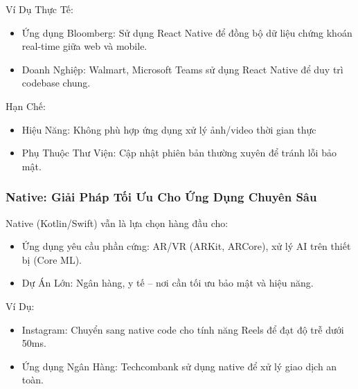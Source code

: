     
      \hspace*{0.8cm}Ví Dụ Thực Tế:
      \setlength{\leftmargini}{1.5cm}
      \begin{itemize}
          \item Ứng dụng Bloomberg: Sử dụng React Native để đồng bộ dữ liệu chứng khoán real-time giữa web và mobile.
          \item Doanh Nghiệp: Walmart, Microsoft Teams sử dụng React Native để duy trì codebase chung.
      \end{itemize}
    \vspace{0.5em}

    
      \hspace*{0.8cm}Hạn Chế:
      \setlength{\leftmargini}{1.5cm}
      \begin{itemize}
          \item Hiệu Năng: Không phù hợp ứng dụng xử lý ảnh/video thời gian thực
          \item Phụ Thuộc Thư Viện: Cập nhật phiên bản thường xuyên để tránh lỗi bảo mật.
      \end{itemize}
    \vspace{0.5em}

    \subsubsection{Native: Giải Pháp Tối Ưu Cho Ứng Dụng Chuyên Sâu}
    
      \hspace*{0.8cm}Native (Kotlin/Swift) vẫn là lựa chọn hàng đầu cho:
      \setlength{\leftmargini}{1.5cm}
      \begin{itemize}
        \item Ứng dụng yêu cầu phần cứng: AR/VR (ARKit, ARCore), xử lý AI trên thiết bị (Core ML).
        \item Dự Án Lớn: Ngân hàng, y tế – nơi cần tối ưu bảo mật và hiệu năng.
      \end{itemize}
    \vspace{0.5em}

    
      \hspace*{0.8cm}Ví Dụ:
      \setlength{\leftmargini}{1.5cm}
      \begin{itemize}
          \item Instagram: Chuyển sang native code cho tính năng Reels để đạt độ trễ dưới 50ms.
          \item Ứng dụng Ngân Hàng: Techcombank sử dụng native để xử lý giao dịch an toàn.
      \end{itemize}
    \vspace{0.5em}

